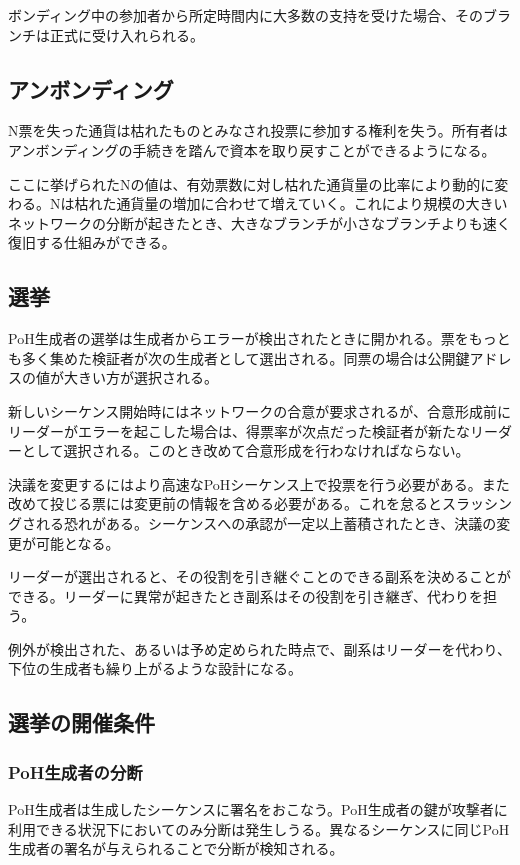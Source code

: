 \documentclass[12pt]{ltjsarticle}
\begin{document}
ボンディング中の参加者から所定時間内に大多数の支持を受けた場合、そのブランチは正式に受け入れられる。

\subsection{アンボンディング}

N票を失った通貨は枯れたものとみなされ投票に参加する権利を失う。所有者はアンボンディングの手続きを踏んで資本を取り戻すことができるようになる。

ここに挙げられたNの値は、有効票数に対し枯れた通貨量の比率により動的に変わる。Nは枯れた通貨量の増加に合わせて増えていく。これにより規模の大きいネットワークの分断が起きたとき、大きなブランチが小さなブランチよりも速く復旧する仕組みができる。

\subsection{選挙}\label{subsec:elections}
PoH生成者の選挙は生成者からエラーが検出されたときに開かれる。票をもっとも多く集めた検証者が次の生成者として選出される。同票の場合は公開鍵アドレスの値が大きい方が選択される。

新しいシーケンス開始時にはネットワークの合意が要求されるが、合意形成前にリーダーがエラーを起こした場合は、得票率が次点だった検証者が新たなリーダーとして選択される。このとき改めて合意形成を行わなければならない。

決議を変更するにはより高速なPoHシーケンス上で投票を行う必要がある。また改めて投じる票には変更前の情報を含める必要がある。これを怠るとスラッシングされる恐れがある。シーケンスへの承認が一定以上蓄積されたとき、決議の変更が可能となる。

リーダーが選出されると、その役割を引き継ぐことのできる副系を決めることができる。リーダーに異常が起きたとき副系はその役割を引き継ぎ、代わりを担う。

例外が検出された、あるいは予め定められた時点で、副系はリーダーを代わり、下位の生成者も繰り上がるような設計になる。

\subsection{選挙の開催条件}
\subsubsection{PoH生成者の分断}

PoH生成者は生成したシーケンスに署名をおこなう。PoH生成者の鍵が攻撃者に利用できる状況下においてのみ分断は発生しうる。異なるシーケンスに同じPoH生成者の署名が与えられることで分断が検知される。
\end{document}
